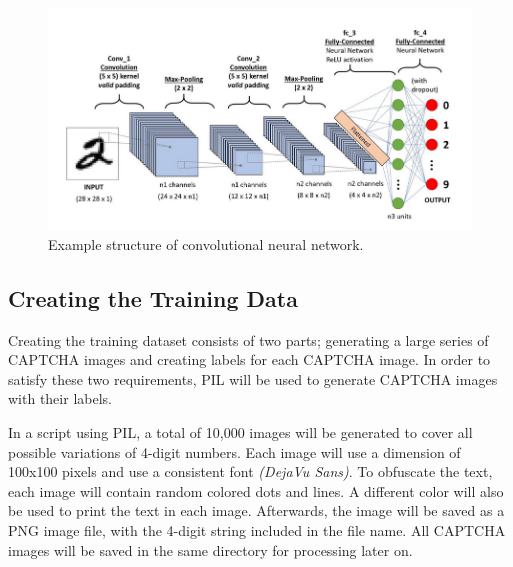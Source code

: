 \documentclass[11pt,conference]{IEEEtran}
\begin{document}
\begin{figure}[htbp]
	\centerline{\includegraphics[scale=0.25]{images/cnn-example.png}}
	\caption{Example structure of convolutional neural network.}
	\label{figure}
\end{figure}


\subsection{Creating the Training Data}
Creating the training dataset consists of two parts; generating a large series
of CAPTCHA images and creating labels for each CAPTCHA image. In order to
satisfy these two requirements, PIL will be used to generate CAPTCHA images
with their labels. 

In a script using PIL, a total of 10,000 images will be generated to cover all
possible variations of 4-digit numbers. Each image will use a dimension of 
100x100 pixels and use a consistent font \emph{(DejaVu Sans)}. To obfuscate the
text, each image will contain random colored dots and lines. A different color
will also be used to print the text in each image. Afterwards, the image will be saved
as a PNG image file, with the 4-digit string included in the file name. All
CAPTCHA images will be saved in the same directory for processing later on.

\end{document}
